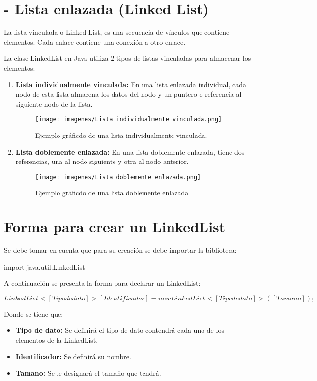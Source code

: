 \documentclass[12pt, letterpaper]{article} %
\begin{document}
\section*{- Lista enlazada (Linked List)}
La lista vinculada o Linked List, es una secuencia de vínculos que contiene elementos. Cada enlace contiene una conexión a otro enlace.
\vspace{5mm} 

La clase LinkedList en Java utiliza 2 tipos de listas vinculadas para almacenar los elementos:
\begin{enumerate}
    \item \textbf{Lista individualmente vinculada:} En una lista enlazada individual, cada nodo de esta lista almacena los datos del nodo y un puntero o referencia al siguiente nodo de la lista.
    \begin{figure}[h]
        \centering
        \texttt{[image: imagenes/Lista individualmente vinculada.png]}
        \caption{Ejemplo gráficdo de una lista individualmente vinculada.}
        \label{fig:individual}
    \end{figure}

    \item \textbf{Lista doblemente enlazada:} En una lista doblemente enlazada, tiene dos referencias, una al nodo siguiente y otra al nodo anterior.
    \begin{figure}[h]
        \centering
        \texttt{[image: imagenes/Lista doblemente enlazada.png]}
        \caption{Ejemplo gráficdo de una lista doblemente enlazada}
        \label{fig:doblemente}
    \end{figure}

\end{enumerate}

\section*{Forma para crear un LinkedList}
Se debe tomar en cuenta que para su creación se debe importar la biblioteca:

\begin{center}
    import java.util.LinkedList;
\end{center}
A continuación se presenta la forma para declarar un LinkedList:

\begin{center}
    $LinkedList<[Tipo de dato]> [Identificador] = new LinkedList<[Tipo de dato]>([Tamano]);$
\end{center}
Donde se tiene que:
\begin{itemize}
    \item \textbf{Tipo de dato:} Se definirá el tipo de dato contendrá cada uno de los elementos de la LinkedList.
    \item \textbf{Identificador:} Se definirá su nombre.
    \item \textbf{Tamano:} Se le designará el tamaño que tendrá.
\end{itemize}
\end{document}
